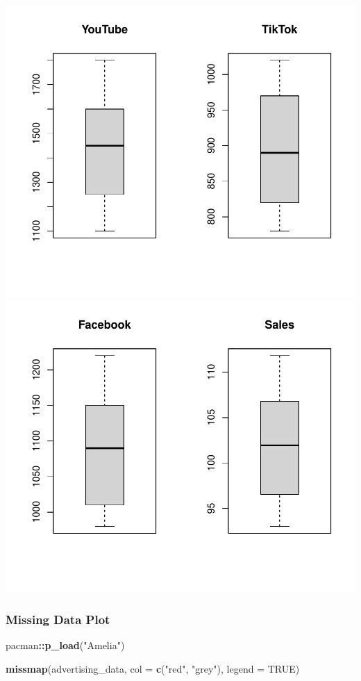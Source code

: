 \documentclass[
]{article}
\newenvironment{Shaded}{\begin{snugshade}}{\end{snugshade}}
\newcommand{\AttributeTok}[1]{\textcolor[rgb]{0.13,0.29,0.53}{#1}}
\newcommand{\ConstantTok}[1]{\textcolor[rgb]{0.56,0.35,0.01}{#1}}
\newcommand{\FunctionTok}[1]{\textcolor[rgb]{0.13,0.29,0.53}{\textbf{#1}}}
\newcommand{\NormalTok}[1]{#1}
\newcommand{\SpecialCharTok}[1]{\textcolor[rgb]{0.81,0.36,0.00}{\textbf{#1}}}
\newcommand{\StringTok}[1]{\textcolor[rgb]{0.31,0.60,0.02}{#1}}
\begin{document}
\includegraphics{2_multiple_linear_regression_files/figure-latex/visualization_boxplot-1.pdf}
\includegraphics{2_multiple_linear_regression_files/figure-latex/visualization_boxplot-2.pdf}

\subsubsection{\texorpdfstring{\textbf{Missing Data
Plot}}{Missing Data Plot}}\label{missing-data-plot}

\begin{Shaded}
\begin{Highlighting}[]
\NormalTok{pacman}\SpecialCharTok{::}\FunctionTok{p\_load}\NormalTok{(}\StringTok{"Amelia"}\NormalTok{)}

\FunctionTok{missmap}\NormalTok{(advertising\_data, }\AttributeTok{col =} \FunctionTok{c}\NormalTok{(}\StringTok{"red"}\NormalTok{, }\StringTok{"grey"}\NormalTok{), }\AttributeTok{legend =} \ConstantTok{TRUE}\NormalTok{)}
\end{Highlighting}
\end{Shaded}
\end{document}
